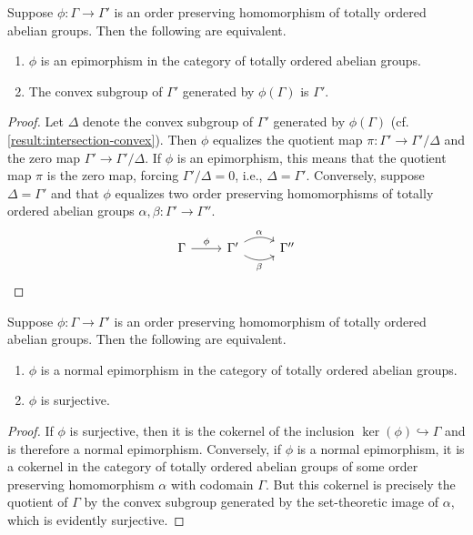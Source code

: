 \begin{lemma}
	Suppose $\phi : \Gamma \to \Gamma'$ is an order preserving homomorphism of totally ordered abelian groups. Then the following are equivalent.  
	\begin{enumerate}[label=(\alph{*})]
		\item $\phi$ is an epimorphism in the category of totally ordered abelian groups. 
		\item The convex subgroup of $\Gamma'$ generated by $\phi(\Gamma)$ is $\Gamma'$. 
	\end{enumerate}
\end{lemma}

\begin{proof}
	Let $\Delta$ denote the convex subgroup of $\Gamma'$ generated by $\phi(\Gamma)$ (cf. \cref{result:intersection-convex}). Then $\phi$ equalizes the quotient map $\pi : \Gamma' \to \Gamma'/\Delta$ and the zero map $\Gamma' \to \Gamma'/\Delta$. If $\phi$ is an epimorphism, this means that the quotient map $\pi$ is the zero map, forcing $\Gamma'/\Delta = 0$, i.e., $\Delta = \Gamma'$. Conversely, suppose $\Delta = \Gamma'$ and that $\phi$ equalizes two order preserving homomorphisms of totally ordered abelian groups $\alpha, \beta : \Gamma' \to \Gamma''$. 
	\[ \begin{tikzcd} \Gamma \ar{r}{\phi} & \Gamma' \ar[bend left]{r}{\alpha} \ar[bend right]{r}[swap]{\beta} & \Gamma'' \end{tikzcd} \]
\end{proof}


\begin{lemma}
	Suppose $\phi : \Gamma \to \Gamma'$ is an order preserving homomorphism of totally ordered abelian groups. Then the following are equivalent.  
	\begin{enumerate}[label=(\alph{*})]
		\item $\phi$ is a normal epimorphism in the category of totally ordered abelian groups. 
		\item $\phi$ is surjective.  
	\end{enumerate}
\end{lemma}

\begin{proof}
	If $\phi$ is surjective, then it is the cokernel of the inclusion $\ker(\phi) \hookrightarrow \Gamma$ and is therefore a normal epimorphism. Conversely, if $\phi$ is a normal epimorphism, it is a cokernel in the category of totally ordered abelian groups of some order preserving homomorphism $\alpha$ with codomain $\Gamma$. But this cokernel is precisely the quotient of $\Gamma$ by the convex subgroup generated by the set-theoretic image of $\alpha$, which is evidently surjective. 
\end{proof}

